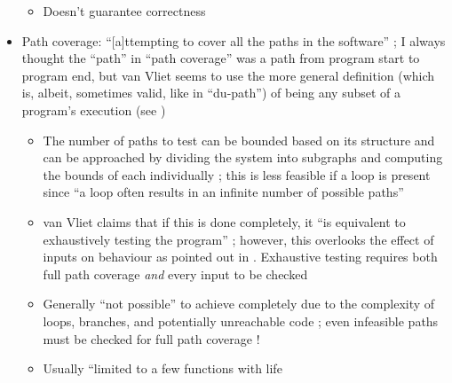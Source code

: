 \begin{itemize}
\begin{itemize}
                  \item Doesn't guarantee correctness
                        \citep[p.~421]{vanVliet2000}
            \end{itemize}
      \item Path coverage: ``[a]ttempting to cover all the paths in the
            software'' \citep[p.~119]{Patton2006};
            I always thought the ``path'' in ``path coverage'' was
            a path from program start to program end, but van
            Vliet seems to use the more general definition (which
            is, albeit, sometimes valid, like in ``du-path'') of
            being any subset of a program's execution (see
            \citep[p.~420]{vanVliet2000})
            \begin{itemize}
                  \item The number of paths to test can be bounded based on its
                        structure and can be approached by dividing the system
                        into subgraphs and computing the bounds of each
                        individually \citep[pp.~471-473]{PetersAndPedrycz2000};
                        this is less feasible if a loop is present
                        \citep[pp.~473-476]{PetersAndPedrycz2000} since ``a loop
                        often results in an infinite number of possible paths''
                        \citep[p.~421]{vanVliet2000}
                  \item van Vliet claims that if this is done completely, it
                        ``is equivalent to exhaustively testing the program''
                        \citep[p.~421]{vanVliet2000};
                        however, this overlooks the effect of inputs on
                        behaviour as pointed out in
                        \citep[pp.~466-467]{PetersAndPedrycz2000}. Exhaustive
                        testing requires both full path coverage \emph{and}
                        every input to be checked
                  \item Generally ``not possible'' to achieve completely due to
                        the complexity of
                        loops, branches, and potentially unreachable code
                        \citep[p.~421]{vanVliet2000}; even infeasible
                        paths must be checked for full path coverage
                        \citep[p.~439]{PetersAndPedrycz2000}!
                  \item Usually ``limited to a few functions with life

\end{itemize}
\end{itemize}
